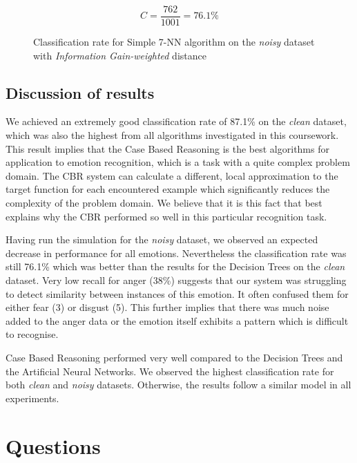 \documentclass[a4paper]{article}
\begin{document}
\begin{figure}[H]
\[ C = \frac{762}{1001} = 76.1\% \]
\caption{Classification rate for Simple 7-NN algorithm on the \emph{noisy} dataset with \emph{Information Gain-weighted} distance}
\end{figure}

\subsection{Discussion of results}

We achieved an extremely good classification rate of 87.1\% on the \emph{clean} dataset, which was also the highest from all algorithms investigated in this coursework. This result implies that the Case Based Reasoning is the best algorithms for application to emotion recognition, which is a task with a quite complex problem domain. The CBR system can calculate a different, local approximation to the target function for each encountered example which significantly reduces the complexity of the problem domain. We believe that it is this fact that best explains why the CBR performed so well in this particular recognition task. \medskip

Having run the simulation for the \emph{noisy} dataset, we observed an expected decrease in performance for all emotions. Nevertheless the classification rate was still 76.1\% which was better than the results for the Decision Trees on the \emph{clean} dataset. Very low recall for anger (38\%) suggests that our system was struggling to detect similarity between instances of this emotion. It often confused them for either fear (3) or disgust (5). This further implies that there was much noise added to the anger data or the emotion itself exhibits a pattern which is difficult to recognise. \medskip

Case Based Reasoning performed very well compared to the Decision Trees and the Artificial Neural Networks. We observed the highest classification rate for both \emph{clean} and \emph{noisy} datasets. Otherwise, the results follow a similar model in all experiments.

\clearpage


\section{Questions}
\end{document}
